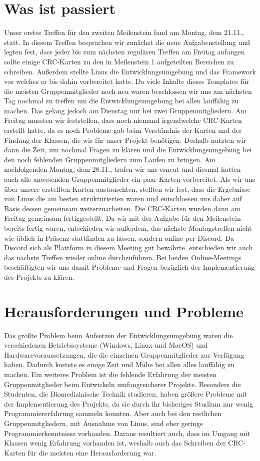 \documentclass[a4paper, 12pt, oneside, BCOR1cm,toc=chapterentrywithdots]{scrbook}
\begin{document}
\section{Was ist passiert}
Unser erstes Treffen für den zweiten Meilenstein fand am Montag, dem 21.11., statt. In diesem Treffen besprachen wir zunächst die neue Aufgabenstellung und legten fest, dass jeder bis zum nächsten regulären Treffen am Freitag anfangen sollte einige CRC-Karten zu den in Meilenstein 1 aufgeteilten Bereichen zu schreiben. Außerdem stellte Linus die Entwicklungsumgebung und das Framework vor welches er bis dahin vorbereitet hatte. Da viele Inhalte dieses Templates für die meisten Gruppenmitglieder noch neu waren beschlossen wir uns am nächsten Tag nochmal zu treffen um die Entwicklungsumgebung bei allen lauffähig zu machen. Das gelang jedoch am Dienstag nur bei zwei Gruppenmitgliedern. Am Freitag mussten wir feststellen, dass noch niemand irgendwelche CRC-Karten erstellt hatte, da es noch Probleme gab beim Verständnis der Karten und der Findung der Klassen, die wir für unser Projekt benötigen. Deshalb nutzten wir dann die Zeit, um nochmal Fragen zu klären und die Entwicklungsumgebung bei den noch fehlenden Gruppenmitgliedern zum Laufen zu bringen. Am nachfolgenden Montag, dem 28.11., trafen wir uns erneut und diesmal hatten auch alle anwesenden Gruppenmitglieder ein paar Karten vorbereitet. Als wir uns über unsere erstellten Karten austauschten, stellten wir fest, dass die Ergebnisse von Linus die am besten strukturierten waren und entschlossen uns daher auf Basis dessen gemeinsam weiterzuarbeiten. Die CRC-Karten wurden dann am Freitag gemeinsam fertiggestellt. Da wir mit der Aufgabe für den Meilenstein bereits fertig waren, entschieden wir außerdem, das nächste Montagstreffen nicht wie üblich in Präsenz stattfinden zu lassen, sondern online per Discord. Da Discord sich als Plattform in diesem Meeting gut bewährte, entschieden wir auch das nächste Treffen wieder online durchzuführen. Bei beiden Online-Meetings beschäftigten wir uns damit Probleme und Fragen bezüglich der Implementierung des Projekts zu klären.
\section{Herausforderungen und Probleme}
Das größte Problem beim Aufsetzen der Entwicklungsumgebung waren die verschiedenen Betriebssysteme (Windows, Linux und MacOS) und Hardwarevoraussetzungen, die die einzelnen Gruppenmitglieder zur Verfügung haben. Dadurch kostete es einige Zeit und Mühe bei allen alles lauffähig zu machen. 
Ein weiteres Problem ist die fehlende Erfahrung der meisten Gruppenmitglieder beim Entwickeln umfangreicherer Projekte. Besonders die Studenten, die Biomedizinische Technik studieren, haben größere Probleme mit der Implementierung des Projekts, da sie durch ihr bisheriges Studium nur wenig Programmiererfahrung sammeln konnten. Aber auch bei den restlichen Gruppenmitgliedern, mit Ausnahme von Linus, sind eher geringe Programmierkenntnisse vorhanden. Daraus resultiert auch, dass im Umgang mit Klassen wenig Erfahrung vorhanden ist, weshalb auch das Schreiben der CRC-Karten für die meisten eine Herausforderung war.
\end{document}

